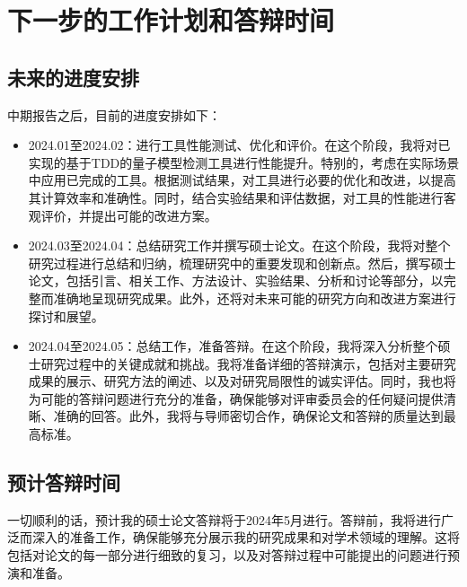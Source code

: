 \chapter{下一步的工作计划和答辩时间}
\section{未来的进度安排}
中期报告之后，目前的进度安排如下： 
\begin{itemize}
    \item 2024.01至2024.02：进行工具性能测试、优化和评价。在这个阶段，我将对已实现的基于TDD的量子模型检测工具进行性能提升。特别的，考虑在实际场景中应用已完成的工具。根据测试结果，对工具进行必要的优化和改进，以提高其计算效率和准确性。同时，结合实验结果和评估数据，对工具的性能进行客观评价，并提出可能的改进方案。
    \item 2024.03至2024.04：总结研究工作并撰写硕士论文。在这个阶段，我将对整个研究过程进行总结和归纳，梳理研究中的重要发现和创新点。然后，撰写硕士论文，包括引言、相关工作、方法设计、实验结果、分析和讨论等部分，以完整而准确地呈现研究成果。此外，还将对未来可能的研究方向和改进方案进行探讨和展望。
    \item 2024.04至2024.05：总结工作，准备答辩。在这个阶段，我将深入分析整个硕士研究过程中的关键成就和挑战。我将准备详细的答辩演示，包括对主要研究成果的展示、研究方法的阐述、以及对研究局限性的诚实评估。同时，我也将为可能的答辩问题进行充分的准备，确保能够对评审委员会的任何疑问提供清晰、准确的回答。此外，我将与导师密切合作，确保论文和答辩的质量达到最高标准。
\end{itemize}
\section{预计答辩时间}
一切顺利的话，预计我的硕士论文答辩将于2024年5月进行。答辩前，我将进行广泛而深入的准备工作，确保能够充分展示我的研究成果和对学术领域的理解。这将包括对论文的每一部分进行细致的复习，以及对答辩过程中可能提出的问题进行预演和准备。